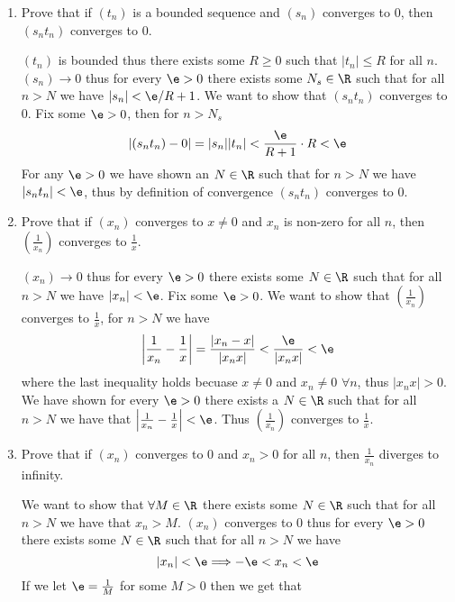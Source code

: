 \documentclass[11pt]{exam}
\begin{document}
    \begin{enumerate}
        \item Prove that if $(t_n)$ is a bounded sequence and $(s_n)$ converges to 0, then $(s_nt_n)$ converges to 0.
            \begin{solution}
                $(t_n)$ is bounded thus there exists some $R \geq 0$ such that $|t_n| \leq R$ for all $n$. \\
                $(s_n) \rightarrow 0$ thus for every $\e > 0$ there exists some $N_s \in \R$ such that for all $n > N$ we have $|s_n| < \e / R + 1$. We want to show that $(s_nt_n)$ converges to 0. Fix some $\e > 0$, then for $n > N_s$ 
                $$|(s_nt_n) - 0| = |s_n||t_n| < \frac{\e}{R+1} \cdot R < \e$$
                For any $\e > 0$ we have shown an $N \in \R$ such that for $n > N$ we have $|s_nt_n| < \e$, thus by definition of convergence $(s_nt_n)$ converges to 0. 
            \end{solution}
        \item Prove that if $(x_n)$ converges to $x \neq 0$ and $x_n$ is non-zero for all $n$, then $\left(\frac{1}{x_n}\right)$ converges to $\frac{1}{x}$.
            \begin{solution}
                $(x_n) \rightarrow 0$ thus for every $\e > 0$ there exists some $N \in \R$ such that for all $n > N$ we have $|x_n| < \e$. Fix some $\e > 0$. We want to show that $\left(\frac{1}{x_n}\right)$ converges to $\frac{1}{x}$, for $n > N$ we have 
                $$\left|\frac{1}{x_n} - \frac{1}{x}\right| = \frac{|x_n-x|}{|x_nx|} < \frac{\e}{|x_nx|} < \e$$
                where the last inequality holds becuase $x \neq 0$ and $x_n \neq 0$ $\forall n$, thus $|x_nx| > 0$. We have shown for every $\e > 0 $ there exists a $N \in \R$ such that for all $n > N$ we have that $\left|\frac{1}{x_n} - \frac{1}{x}\right| < \e$. Thus $\left(\frac{1}{x_n}\right)$ converges to $\frac{1}{x}$.
            \end{solution}
        \item Prove that if $(x_n)$ converges to 0 and $x_n > 0$ for all $n$, then $\frac{1}{x_n}$ diverges to infinity.
            \begin{solution}
             We want to show that $\forall M \in \R$ there exists some $N \in \R$ such that for all $n > N$ we have that $x_n > M$. $(x_n)$ converges to 0 thus for every $\e > 0$ there exists some $N \in \R$ such that for all $n > N$ we have 
             $$|x_n| < \e \Longrightarrow -\e < x_n < \e$$
             If we let $\e = \frac{1}{M}$ for some $M > 0$ then we get that 

\end{solution}
\end{enumerate}
\end{document}
